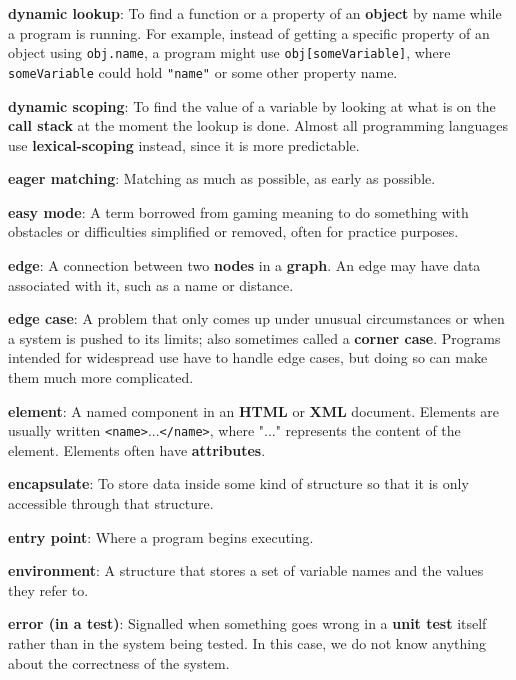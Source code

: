 \documentclass[krantzl]{krantz}
\newcommand{\glosskey}[1]{\textbf{#1}}
\begin{document}
\noindent \textbf{\glosskey{dynamic lookup}}: 
To find a function or a property of an \glosskey{object} by name while a program is running. For example, instead of getting a specific property of an object using \texttt{obj.name}, a program might use \texttt{obj[someVariable]}, where \texttt{someVariable} could hold \texttt{"name"} or some other property name.


\noindent \textbf{\glosskey{dynamic scoping}}: 
To find the value of a variable by looking at what is on the \glosskey{call stack} at the moment the lookup is done. Almost all programming languages use \glosskey{lexical-scoping} instead, since it is more predictable.


\noindent \textbf{\glosskey{eager matching}}: 
Matching as much as possible, as early as possible.


\noindent \textbf{\glosskey{easy mode}}: 
A term borrowed from gaming meaning to do something with obstacles or difficulties simplified or removed, often for practice purposes.


\noindent \textbf{\glosskey{edge}}: 
A connection between two \glosskey{nodes} in a \glosskey{graph}. An edge may have data associated with it, such as a name or distance.


\noindent \textbf{\glosskey{edge case}}: 
A problem that only comes up under unusual circumstances or when a system is pushed to its limits; also sometimes called a \glosskey{corner case}. Programs intended for widespread use have to handle edge cases, but doing so can make them much more complicated.


\noindent \textbf{\glosskey{element}}: 
A named component in an \glosskey{HTML} or \glosskey{XML} document. Elements are usually written \texttt{<name>}...\texttt{</name>}, where "..." represents the content of the element. Elements often have \glosskey{attributes}.


\noindent \textbf{\glosskey{encapsulate}}: 
To store data inside some kind of structure so that it is only accessible through that structure.


\noindent \textbf{\glosskey{entry point}}: 
Where a program begins executing.


\noindent \textbf{\glosskey{environment}}: 
A structure that stores a set of variable names and the values they refer to.


\noindent \textbf{\glosskey{error (in a test)}}: 
Signalled when something goes wrong in a \glosskey{unit test} itself rather than in the system being tested. In this case, we do not know anything about the correctness of the system.
\end{document}
